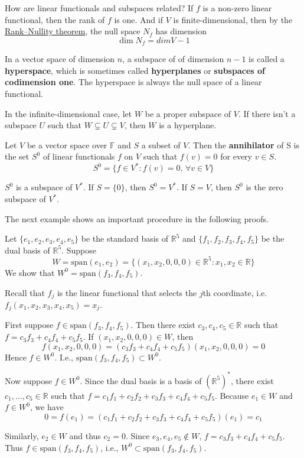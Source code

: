 How are linear functionals and subspaces related? If $f$ is a non-zero linear functional, then the rank of $f$ is one. And if $V$ is finite-dimensional, then by the \hyperref[thm:rank-null]{Rank–Nullity theorem}, the null space $N_f$ has dimension
\[
	\dim N_f = dim V - 1
\]

In a vector space of dimension $n$, a subspace of of dimension $n-1$ is called a \textbf{hyperspace}, which is sometimes called \textbf{hyperplanes} or \textbf{subspaces of codimension one}. The hyperspace is always the null space of a linear functional.

In the infinite-dimensional case, let $W$ be a proper subspace of $V$. If there isn't a subspace $U$ such that $W \subsetneq U \subsetneq V$, then $W$ is a hyperplane.

\begin{definition}[Annihilator]
	Let $V$ be a vector space over $\mathbb{F}$ and $S$ a subset of $V$. Then the \textbf{annihilator} of S is the set $S^0$ of linear functionals $f$ on $V$ such that $f(v) = 0$ for every $v \in S$.
	\[
		S^0 = \{ f \in V^\ast : f(v) = 0, \, \forall v \in V \}
	\]
\end{definition}

$S^0$ is a subspace of $V^\ast$. If $S = \{ 0 \}$, then $S^0 = V^\ast$. If $S = V$, then $S^0$ is the zero subspace of $V^\ast$.

The next example shows an important procedure in the following proofs.

\begin{example}
	Let $\{ e_1, e_2, e_3, e_4, e_5 \}$ be the standard basis of $\mathbb{R}^5$ and $\{ f_1, f_2, f_3, f_4, f_5 \}$ be the dual basis of $\mathbb{R}^5$. Suppose
	\[
		W = \text{span}(e_1, e_2) = \{ (x_1, x_2, 0, 0, 0)  \in \mathbb{R}^5 : x_1, x_2 \in \mathbb{R} \}
	\]
	We show that $W^0 = \text{span}(f_3, f_4, f_5)$.

	Recall that $f_j$ is the linear functional that selects the $j$th coordinate, i.e. $f_j(x_1, x_2, x_3, x_4, x_5) = x_j$.

	First suppose $f \in \text{span}(f_3, f_4, f_5)$. Then there exist $c_3, c_4, c_5 \in \mathbb{R}$ such that $f = c_3 f_3 + c_4 f_4 + c_5 f_5$. If $(x_1, x_2, 0, 0, 0) \in W$, then 
	\[
		f(x_1, x_2, 0, 0, 0) = (c_3 f_3 + c_4 f_4 + c_5 f_5)(x_1, x_2, 0, 0, 0) = 0
	\]
	Hence $f \in W^0$. I.e., $\text{span}(f_3, f_4, f_5) \subset W^0$.

	Now suppose $f \in W^0$. Since the dual basis is a basis of $(\mathbb{R}^5)^\ast$, there exist $c_1, \ldots, c_5 \in \mathbb{R}$ such that $f = c_1 f_1 + c_2 f_2 + c_3 f_3 + c_4 f_4 + c_5 f_5$. Because $e_1 \in W$ and $f \in W^0$, we have
	\[
		0 = f(e_1) = (c_1 f_1 + c_2 f_2 + c_3 f_3 + c_4 f_4 + c_5 f_5)(e_1) = c_1
	\]

	Similarly, $e_2 \in W$ and thus $c_2 = 0$. Since $e_3, e_4, e_5 \notin W$, $f = c_3 f_3 + c_4 f_4 + c_5 f_5$. Thus $f \in \text{span}(f_3, f_4, f_5)$, i.e., $W^0 \subset \text{span}(f_3, f_4, f_5)$.
\end{example}

